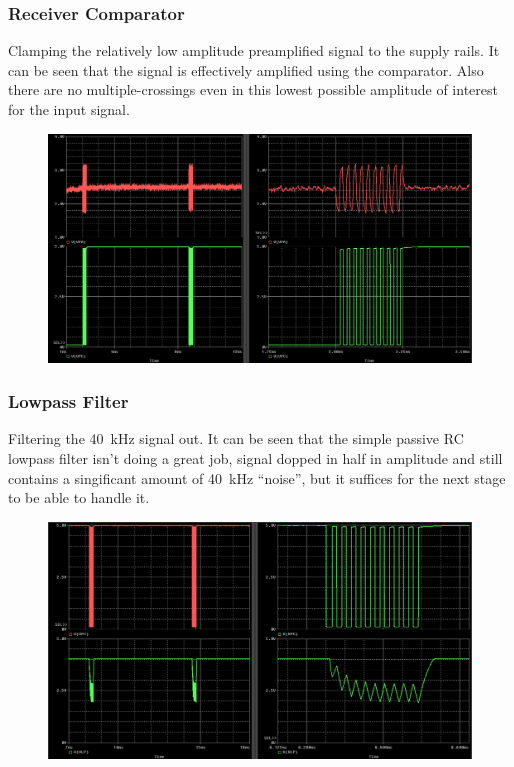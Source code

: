 \documentclass[12pt, a4paper]{article}
\begin{document}
            \pagebreak
            \subsubsection{Receiver Comparator}
                \noindent Clamping the relatively low amplitude preamplified signal to the supply rails. It can be seen that the signal is effectively amplified using the comparator. Also there are no multiple-crossings even in this lowest possible amplitude of interest for the input signal. 

                \begin{figure}[H]\centering
                    \includegraphics[width = \textwidth]{simulations/receive/preamp_comparator.png}
                    \caption[]{}
                \end{figure}
            
            \pagebreak
            \subsubsection{Lowpass Filter}
                \noindent Filtering the \SI{40}{\kilo\hertz} signal out. It can be seen that the simple passive RC lowpass filter isn't doing a great job, signal dopped in half in amplitude and still contains a singificant amount of \SI{40}{\kilo\hertz} ``noise'', but it suffices for the next stage to be able to handle it.

                \begin{figure}[H]\centering
                    \includegraphics[width = \textwidth]{simulations/receive/lpf.png}
                    \caption[]{}
                \end{figure}
            
\end{document}
